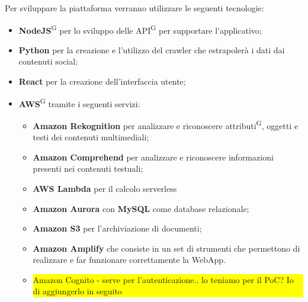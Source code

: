 Per sviluppare la piattaforma verranno utilizzare le seguenti tecnologie:
\begin{itemize}
    \item \textbf{NodeJS}\textsuperscript{G} per lo sviluppo delle API\textsuperscript{G} per supportare l’applicativo;
    \item \textbf{Python} per la creazione e l'utilizzo del crawler che estrapolerà i dati dai contenuti social;
    \item \textbf{React} per la creazione dell'interfaccia utente;
    \item \textbf{AWS}\textsuperscript{G} tramite i seguenti servizi:
    \begin{itemize}
    	\item \textbf{Amazon Rekognition} per analizzare e riconoscere attributi\textsuperscript{G}, oggetti e testi dei contenuti multimediali;
    	\item \textbf{Amazon Comprehend} per analizzare e riconoscere informazioni presenti nei contenuti testuali;
    	\item  \textbf{AWS Lambda} per il calcolo serverless
    	\item \textbf{Amazon Aurora} con \textbf{MySQL} come database relazionale;
    	\item \textbf{Amazon S3} per l'archiviazione di documenti;
    	\item \textbf{Amazon Amplify} che consiste in un set di strumenti che permettono di realizzare e far funzionare correttamente la WebApp.
    	\item {\colorbox{yellow}{\parbox{0.8\textwidth}{Amazon Cognito - serve per l'autenticazione.. lo teniamo per il PoC? Io di aggiungerlo in seguito}}}
	\end{itemize}
  \end{itemize}